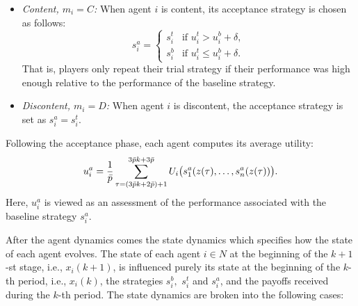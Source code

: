 \begin{itemize}%
%
\item {\it Content, $m_i = C$:}
When agent $i$ is content, its acceptance strategy is chosen as follows:
\begin{equation}
s_i^a = \left\{
\begin{array}{ll}
s_i^t &\text{if } u_i^t > u_i^b + \delta, \\
s_i^b &\text{if } u_i^t \leq u_i^b + \delta. 
\end{array}\right.
\end{equation}
%
That is, players only repeat their trial strategy if their performance was high enough relative to the performance of the baseline strategy.  

\item {\it Discontent, $m_i = D$:}
When agent $i$ is discontent, the acceptance strategy is set as $s_i^a = s_i^t$.
\end{itemize}

Following the acceptance phase, each agent computes its average utility:
%
\begin{equation}\label{e:acceptance payoff}
u_i^a = {1\over \bar{p}}\sum_{\tau = (3 \bar{p} k + 2\bar{p})+1}^{3\bar{p} k + 3\bar{p}}U_i\bigl(s_1^a(z(\tau), \dots, s_n^a(z(\tau))  \bigr).
\end{equation}
%
Here, $u_i^a$ is viewed as an assessment of the performance associated with the baseline strategy $s_i^a$.  
%
%


\vspace{.2cm}

  After the agent dynamics comes the state dynamics which specifies how the state of each agent evolves.  The state of each agent $i \in N$ at the beginning of the $k+1$-st stage, i.e., $x_i(k+1)$, is influenced purely its state at the beginning of the $k$-th period, i.e., $x_i(k)$, the strategies $s_i^b,$ $s_i^t$ and $s_i^a$, and the payoffs received during the $k$-th period.   The state dynamics are broken into the following cases:
%  

\vspace{.2cm}

